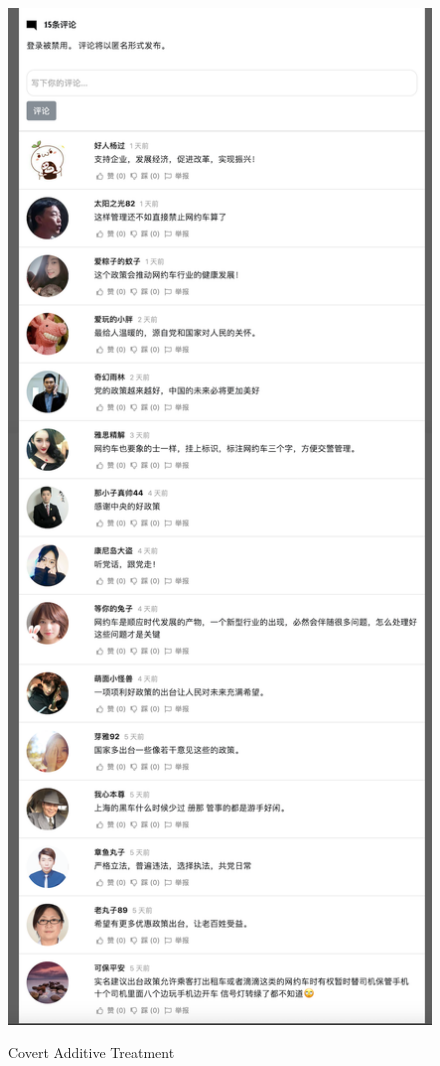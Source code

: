 \documentclass[11pt]{article}
\begin{document}
\begin{figure}
  \centering
  \caption{Covert Additive Treatment}
  \vspace{1em}
  \includegraphics[height=.9\textheight]{figures/covert_additive.png}
  \label{covert_additive}
\end{figure}
\end{document}
